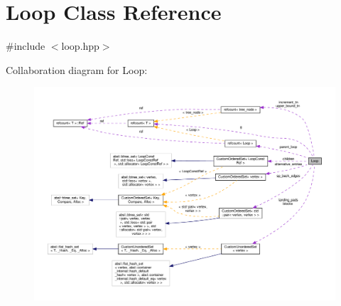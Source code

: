 \hypertarget{classLoop}{}\section{Loop Class Reference}
\label{classLoop}


{\ttfamily \#include $<$loop.\+hpp$>$}



Collaboration diagram for Loop\+:
\nopagebreak
\begin{figure}[H]
\begin{center}
\leavevmode
\includegraphics[width=350pt]{dd/d79/classLoop__coll__graph}
\end{center}
\end{figure}
